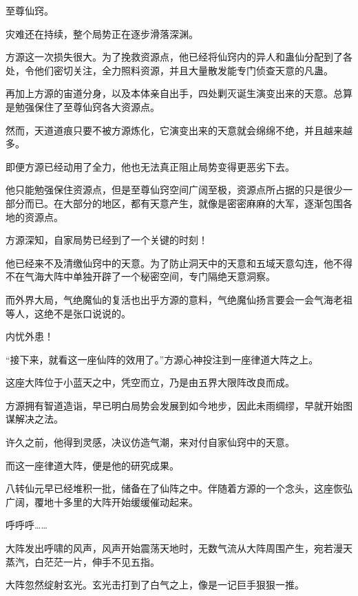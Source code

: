 
\begin{this_body}



至尊仙窍。

灾难还在持续，整个局势正在逐步滑落深渊。

方源这一次损失很大。为了挽救资源点，他已经将仙窍内的异人和蛊仙分配到了各处，令他们密切关注，全力照料资源，并且大量散发能专门侦查天意的凡蛊。

再加上方源的宙道分身，以及本体亲自出手，四处剿灭诞生演变出来的天意。总算是勉强保住了至尊仙窍各大资源点。

然而，天道道痕只要不被方源炼化，它演变出来的天意就会绵绵不绝，并且越来越多。

即便方源已经动用了全力，他也无法真正阻止局势变得更恶劣下去。

他只能勉强保住资源点，但是至尊仙窍空间广阔至极，资源点所占据的只是很少一部分而已。在大部分的地区，都有天意产生，就像是密密麻麻的大军，逐渐包围各地的资源点。

方源深知，自家局势已经到了一个关键的时刻！

他已经来不及清缴仙窍中的天意。为了防止洞天中的天意和五域天意勾连，他不得不在气海大阵中单独开辟了一个秘密空间，专门隔绝天意洞察。

而外界大局，气绝魔仙的复活也出乎方源的意料，气绝魔仙扬言要会一会气海老祖等人，这绝不是张口说说的。

内忧外患！

“接下来，就看这一座仙阵的效用了。”方源心神投注到一座律道大阵之上。

这座大阵位于小蓝天之中，凭空而立，乃是由五界大限阵改良而成。

方源拥有智道造诣，早已明白局势会发展到如今地步，因此未雨绸缪，早就开始图谋解决之法。

许久之前，他得到灵感，决议仿造气潮，来对付自家仙窍中的天意。

而这一座律道大阵，便是他的研究成果。

八转仙元早已经堆积一批，储备在了仙阵之中。伴随着方源的一个念头，这座恢弘广阔，覆地十多里的大阵开始缓缓催动起来。

呼呼呼……

大阵发出呼啸的风声，风声开始震荡天地时，无数气流从大阵周围产生，宛若漫天蒸汽，白茫茫一片，伸手不见五指。

大阵忽然绽射玄光。玄光击打到了白气之上，像是一记巨手狠狠一推。


\end{this_body}
